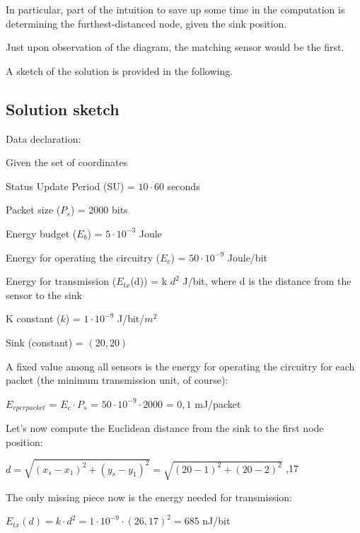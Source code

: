 \documentclass[a4paper,11pt]{article} %
\begin{document}
    In particular, part of the intuition to save up some time in the computation is determining the furthest-distanced node, given the sink position.

    Just upon observation of the diagram, the matching sensor would be the first.

    A sketch of the solution is provided in the following.

    \subsection{Solution sketch}\label{subsec:solution-sketch}

    Data declaration:

    \medskip

    Given the set of coordinates

    Status Update Period (SU) = $10 \cdot 60$ seconds

    Packet size ($P_s$) = 2000 bits

    Energy budget ($E_b$) = $5 \cdot 10^{-3}$ Joule

    Energy for operating the circuitry ($E_c$) = $50 \cdot 10^{-9}$ Joule/bit

    Energy for transmission ($E_{tx}$(d)) = k \cdot $d^2$ J/bit, where d is the distance from the sensor to the sink

    K constant ($k$) = $1 \cdot 10^{-9}$ J/bit/$m^2$

    Sink (constant) = $(20, 20)$

    \bigskip

    A fixed value among all sensors is the energy for operating the circuitry for each packet (the minimum transmission unit, of course):

    $E_{c per packet}$ = $E_c \cdot P_s$ = $50 \cdot 10^{-9} \cdot 2000$ = $0,1$ mJ/packet

    \bigskip

    Let's now compute the Euclidean distance from the sink to the first node position:

    \smallskip

    $d = \sqrt{{(x_s - x_1)}^2+{(y_s - y_1)}^2} = \sqrt{{(20 - 1)}^2+{(20 - 2)}^2}$ ,17

    \bigskip

    The only missing piece now is the energy needed for transmission:

    \smallskip

    $E_{tx}(d) = k \cdot d^2 = 1 \cdot 10^{-9} \cdot (26,17)^2 = 685$ nJ/bit
\end{document}
